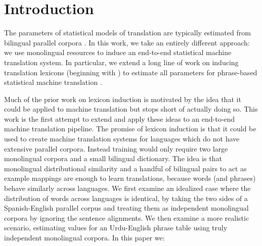 \documentclass[11pt]{article}
\newcommand{\mtodo}[1]{}
\begin{document}
\begin{abstract}
\end{abstract}


\section{Introduction} \label{sect:intro}

The parameters of statistical models of translation are typically estimated from bilingual parallel corpora \cite{Brown:1993}. 
In this work, we take an entirely different approach: we use monolingual resources to induce an end-to-end statistical machine translation system.  In particular, we extend a long line of work on inducing translation lexicons (beginning with ) to estimate all parameters for phrase-based statistical machine translation \cite{Koehn:2003}.

Much of the prior work on lexicon induction is motivated by the idea that it could be applied to machine translation but stops short of actually doing so.  This work is the first attempt to extend and apply these ideas to an end-to-end machine translation pipeline. 
The promise of lexicon induction is that it could be used to create machine translation systems for languages which do not have extensive parallel corpora. 
Instead training would only require two large monolingual corpora and a small bilingual dictionary. %
The idea is that monolingual distributional similarity and a handful of bilingual pairs to act as example mappings are enough to learn translations, because words (and phrases) behave similarly across languages.  
We first examine an idealized case where the distribution of words across languages is identical, by taking the two sides of a Spanish-English parallel corpus and treating them as independent monolingual corpora by ignoring the sentence alignments. 
We then examine a more realistic scenario, estimating values for an Urdu-English phrase table using truly independent monolingual corpora.
In this paper we:
\end{document}

